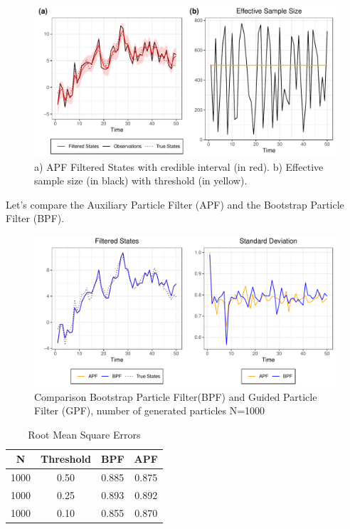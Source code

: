 \documentclass[
]{book}
\theoremstyle{break}
\theoremstyle{nonumberplain}
\begin{document}
\begin{figure}[H]

{\centering \includegraphics{final-draft_files/figure-latex/unnamed-chunk-26-1} 

}

\caption{a) APF Filtered States with credible interval (in red). b) Effective sample size (in black) with threshold (in yellow).}\label{fig:unnamed-chunk-26}
\end{figure}

Let's compare the Auxiliary Particle Filter (APF) and the Bootstrap
Particle Filter (BPF).

\begin{figure}[H]

{\centering \includegraphics{final-draft_files/figure-latex/unnamed-chunk-27-1} 

}

\caption{Comparison Bootstrap Particle Filter(BPF) and Guided Particle Filter (GPF), number of generated particles N=1000}\label{fig:unnamed-chunk-27}
\end{figure}

\begin{longtable}[t]{cccc}
\caption{\label{tab:unnamed-chunk-29}Root Mean Square Errors}\\
\toprule
N & Threshold & BPF & APF\\
\midrule
1000 & 0.50 & 0.885 & 0.875\\
1000 & 0.25 & 0.893 & 0.892\\
1000 & 0.10 & 0.855 & 0.870\\
\bottomrule
\end{longtable}
\end{document}
